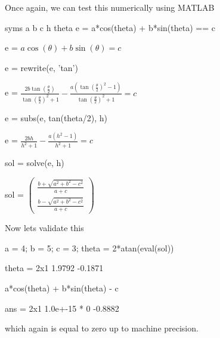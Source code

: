 \documentclass[11pt,a4paper,fleqn]{article}
\begin{document}
Once again, we can test this numerically using MATLAB
\begin{matlabcode}
syms a b c h theta
e = a*cos(theta) + b*sin(theta) == c
\end{matlabcode}
\begin{matlabsymbolicoutput}
e = 
    $\displaystyle a \cos \left(\theta \right)+b \sin \left(\theta \right)=c$
\end{matlabsymbolicoutput}
\begin{matlabcode}
e = rewrite(e, 'tan')
\end{matlabcode}
\begin{matlabsymbolicoutput}
e = 
    $\displaystyle \frac{2 b \tan \left(\frac{\theta }{2}\right)}{{\tan \left(\frac{\theta }{2}\right)}^2 +1}-\frac{a {\left({\tan \left(\frac{\theta }{2}\right)}^2 -1\right)}}{{\tan \left(\frac{\theta }{2}\right)}^2 +1}=c$
\end{matlabsymbolicoutput}
\begin{matlabcode}
e = subs(e, tan(theta/2), h)
\end{matlabcode}
\begin{matlabsymbolicoutput}
e = 
    $\displaystyle \frac{2 b h}{h^2 +1}-\frac{a {\left(h^2 -1\right)}}{h^2 +1}=c$
\end{matlabsymbolicoutput}
\begin{matlabcode}
sol = solve(e, h)
\end{matlabcode}
\begin{matlabsymbolicoutput}
sol = 
    $\displaystyle \left(\begin{array}{c}
\frac{b+\sqrt{a^2 +b^2 -c^2 }}{a+c}\\
\frac{b-\sqrt{a^2 +b^2 -c^2 }}{a+c}
\end{array}\right)$
\end{matlabsymbolicoutput}

\begin{par}
\begin{flushleft}
Now lets validate this
\end{flushleft}
\end{par}

\begin{matlabcode}
a = 4; b = 5; c = 3;
theta = 2*atan(eval(sol))
\end{matlabcode}
\begin{matlaboutput}
theta = 2x1    
    1.9792
   -0.1871

\end{matlaboutput}
\begin{matlabcode}
a*cos(theta) + b*sin(theta) - c
\end{matlabcode}
\begin{matlaboutput}
ans = 2x1    
1.0e+-15 *
         0
   -0.8882
\end{matlaboutput}
which again is equal to zero up to machine precision.
\end{document}
